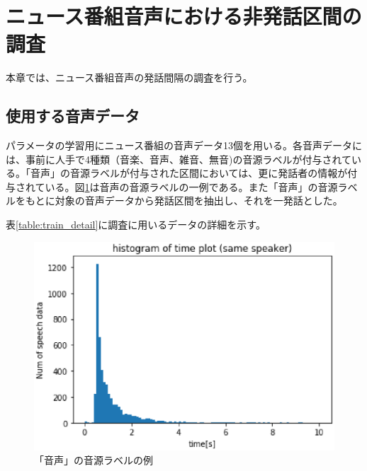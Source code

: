 \section{ニュース番組音声における非発話区間の調査}
本章では、ニュース番組音声の発話間隔の調査を行う。

\subsection{使用する音声データ}
パラメータの学習用にニュース番組の音声データ13個を用いる。各音声データには、事前に人手で4種類（音楽、音声、雑音、無音)の音源ラベルが付与されている。「音声」の音源ラベルが付与された区間においては、更に発話者の情報が付与されている。図\ref{fig:example_label}は音声の音源ラベルの一例である。また「音声」の音源ラベルをもとに対象の音声データから発話区間を抽出し、それを一発話とした。\par
表\ref{table:train_detail}に調査に用いるデータの詳細を示す。\vspace{0.2in}

\begin{figure}[H]
  \begin{center}
    \includegraphics{./figure/same_sp.eps}
  \end{center}
  \caption{「音声」の音源ラベルの例 \label{fig:example_label}}
\end{figure}

